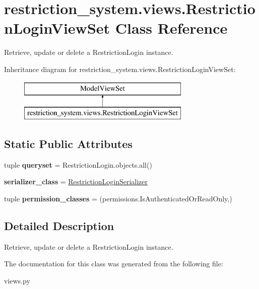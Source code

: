 \hypertarget{classrestriction__system_1_1views_1_1RestrictionLoginViewSet}{}\section{restriction\+\_\+system.\+views.\+Restriction\+Login\+View\+Set Class Reference}
\label{classrestriction__system_1_1views_1_1RestrictionLoginViewSet}


Retrieve, update or delete a Restriction\+Login instance.  


Inheritance diagram for restriction\+\_\+system.\+views.\+Restriction\+Login\+View\+Set\+:\begin{figure}[H]
\begin{center}
\leavevmode
\includegraphics[height=2.000000cm]{classrestriction__system_1_1views_1_1RestrictionLoginViewSet}
\end{center}
\end{figure}
\subsection*{Static Public Attributes}
\begin{DoxyCompactItemize}
\item 
\hypertarget{classrestriction__system_1_1views_1_1RestrictionLoginViewSet_a025c79cc97507ef2908637a4ee8cb601}{}tuple {\bfseries queryset} = Restriction\+Login.\+objects.\+all()\label{classrestriction__system_1_1views_1_1RestrictionLoginViewSet_a025c79cc97507ef2908637a4ee8cb601}

\item 
\hypertarget{classrestriction__system_1_1views_1_1RestrictionLoginViewSet_a2bf3dc7f632f134dfc6157d0e239480c}{}{\bfseries serializer\+\_\+class} = \hyperlink{classrestriction__system_1_1serializers_1_1RestrictionLoginSerializer}{Restriction\+Login\+Serializer}\label{classrestriction__system_1_1views_1_1RestrictionLoginViewSet_a2bf3dc7f632f134dfc6157d0e239480c}

\item 
\hypertarget{classrestriction__system_1_1views_1_1RestrictionLoginViewSet_aeee83a7bea59f2c890651aac54eab676}{}tuple {\bfseries permission\+\_\+classes} = (permissions.\+Is\+Authenticated\+Or\+Read\+Only,)\label{classrestriction__system_1_1views_1_1RestrictionLoginViewSet_aeee83a7bea59f2c890651aac54eab676}

\end{DoxyCompactItemize}


\subsection{Detailed Description}
Retrieve, update or delete a Restriction\+Login instance. 



The documentation for this class was generated from the following file\+:\begin{DoxyCompactItemize}
\item 
views.\+py\end{DoxyCompactItemize}
